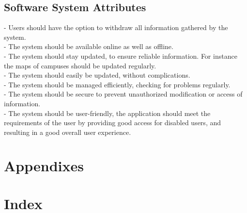 \documentclass[12pt]{article}
\begin{document}
	\subsection{Software System Attributes}
	- Users should have the option to withdraw all information gathered by the system.\\
	- The system should be available online as well as offline.\\
	- The system should stay updated, to ensure reliable information. For instance the maps of campuses should be updated regularly. \\
	- The system should easily be updated, without complications. \\
	- The system should be managed efficiently, checking for problems regularly. \\
	- The system should be secure to prevent unauthorized modification or access of information. \\
	- The system should be user-friendly, the application should meet the requirements of the user by providing good access for disabled users, and resulting in a good overall user experience.
	\section{Appendixes}
	\section{Index}
\end{document}
